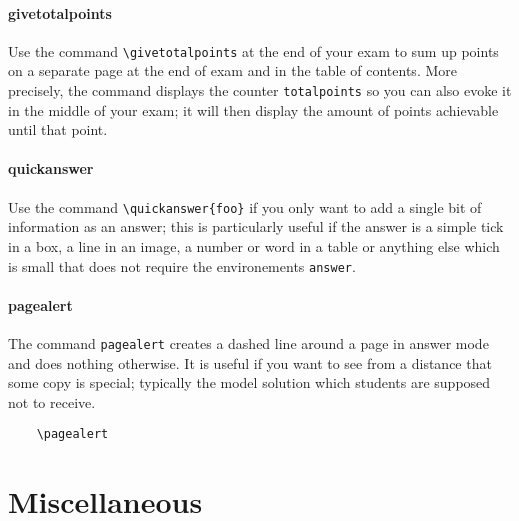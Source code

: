 \documentclass[a4paper]{scrartcl}
\begin{document}
 

\paragraph{givetotalpoints}

Use the command \verb|\givetotalpoints| at the end of your exam to sum up points on a separate page at the end of exam and in the table of contents. More precisely, the command displays the counter \verb|totalpoints| so you can also evoke it in the middle of your exam; it will then display the amount of points achievable until that point.

\paragraph{quickanswer}

Use the command \verb|\quickanswer{foo}| if you only want to add a  single bit of information as an answer; this is particularly useful if the answer is a simple tick in a box, a line in an image, a number or word in a table or anything else which is small that does not require the environements \verb|answer|. 



\paragraph{pagealert}
The command \verb|pagealert| creates a dashed line around a page in answer mode and does nothing otherwise. It is useful if you want to see from a distance that some copy is special; typically the model solution which students are supposed not to receive.  

\begin{verbatim}
    \pagealert
\end{verbatim}


\section*{Miscellaneous}
\end{document}
